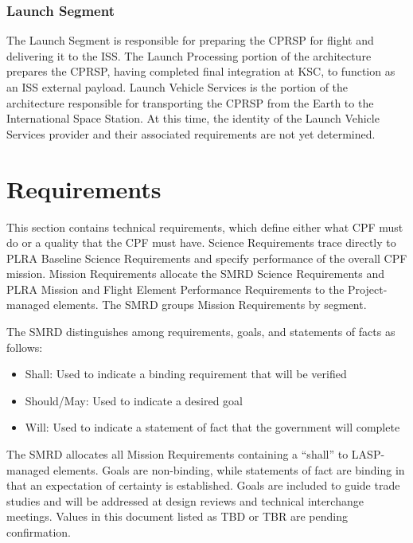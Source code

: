 \subsection{Launch Segment }
\label{launchsegment}

The Launch Segment is responsible for preparing the \gls{CPRSP} for flight and delivering it to the \gls{ISS}. The Launch Processing portion of the architecture prepares the \gls{CPRSP}, having completed final integration at \gls{KSC}, to function as an \gls{ISS} external payload. Launch Vehicle Services is the portion of the architecture responsible for transporting the \gls{CPRSP} from the Earth to the International Space Station. At this time, the identity of the Launch Vehicle Services provider and their associated requirements are not yet determined.

\chapter{Requirements  }
\label{sec_req}

\renewcommand\labelitemi{}

This section contains technical requirements, which define either what \gls{CPF} must do or a quality that the \gls{CPF} must have. Science Requirements trace directly to PLRA Baseline Science Requirements and specify performance of the overall \gls{CPF} mission. Mission Requirements allocate the \gls{SMRD} Science Requirements and PLRA Mission and Flight Element Performance Requirements to the Project-managed elements. The \gls{SMRD} groups Mission Requirements by segment.

The \gls{SMRD} distinguishes among requirements, goals, and statements of facts as follows:

\begin{itemize}
\item{} Shall: Used to indicate a binding requirement that will be verified

\item{} Should\slash May: Used to indicate a desired goal

\item{} Will: Used to indicate a statement of fact that the government will complete

\end{itemize}

The \gls{SMRD} allocates all Mission Requirements containing a ``shall'' to \gls{LASP}-managed elements. Goals are non-binding, while statements of fact are binding in that an expectation of certainty is established. Goals are included to guide trade studies and will be addressed at design reviews and technical interchange meetings. Values in this document listed as TBD or TBR are pending confirmation.

